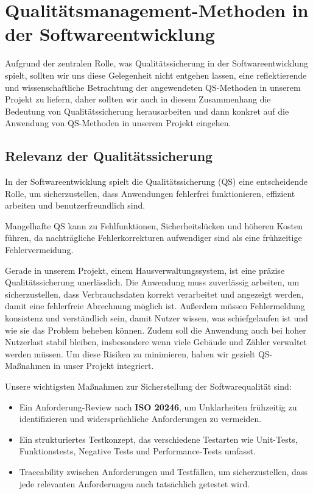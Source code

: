 \newpage
\section{Qualitätsmanagement-Methoden in der Softwareentwicklung}\label{sec:qualitatsmanagement-methoden-in-der-softwareentwicklung}

Aufgrund der zentralen Rolle, was Qualitätssicherung in der Softwareentwicklung spielt, sollten wir uns diese Gelegenheit nicht entgehen lassen, eine reflektierende und wissenschaftliche Betrachtung der angewendeten QS-Methoden in unserem Projekt zu liefern, daher sollten wir auch
in diesem Zusammenhang die Bedeutung von Qualitätssicherung herausarbeiten und dann konkret auf die Anwendung von QS-Methoden in unserem Projekt eingehen.

\subsection{Relevanz der Qualitätssicherung}\label{subsec:relevanz-der-qualitatssicherung}

In der Softwareentwicklung spielt die Qualitätssicherung (QS) eine entscheidende Rolle, um sicherzustellen, dass Anwendungen fehlerfrei funktionieren, effizient arbeiten und benutzerfreundlich sind.

Mangelhafte QS kann zu Fehlfunktionen, Sicherheitslücken und höheren Kosten führen, da nachträgliche Fehlerkorrekturen aufwendiger sind als eine frühzeitige Fehlervermeidung.

Gerade in unserem Projekt, einem Hausverwaltungssystem, ist eine präzise Qualitätssicherung unerlässlich.
Die Anwendung muss zuverlässig arbeiten, um sicherzustellen, dass Verbrauchsdaten korrekt verarbeitet und angezeigt werden, damit eine fehlerfreie Abrechnung möglich ist.
Außerdem müssen Fehlermeldung konsistenz und verständlich sein, damit Nutzer wissen, was schiefgelaufen ist und wie sie das Problem beheben können.
Zudem soll die Anwendung auch bei hoher Nutzerlast stabil bleiben, insbesondere wenn viele Gebäude und Zähler verwaltet werden müssen.
Um diese Risiken zu minimieren, haben wir gezielt QS-Maßnahmen in unser Projekt integriert.

Unsere wichtigsten Maßnahmen zur Sicherstellung der Softwarequalität sind:

\begin{itemize}
    \item Ein Anforderung-Review nach \textbf{ISO 20246}, um Unklarheiten frühzeitig zu identifizieren und widersprüchliche Anforderungen zu vermeiden.
    \item Ein strukturiertes Testkonzept, das verschiedene Testarten wie Unit-Tests, Funktionstests, Negative Tests und Performance-Tests umfasst.
    \item Traceability zwischen Anforderungen und Testfällen, um sicherzustellen, dass jede relevanten Anforderungen auch tatsächlich getestet wird.
\end{itemize}


